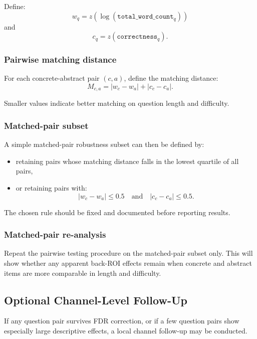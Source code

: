 Define:
\begin{equation}
w_q = z\!\left(\log(\texttt{total\_word\_count}_q)\right)
\end{equation}
and
\begin{equation}
c_q = z(\texttt{correctness}_q).
\end{equation}

\subsubsection{Pairwise matching distance}
For each concrete-abstract pair \((c,a)\), define the matching distance:
\begin{equation}
M_{c,a}
=
|w_c - w_a| + |c_c - c_a|.
\end{equation}

Smaller values indicate better matching on question length and difficulty.

\subsubsection{Matched-pair subset}
A simple matched-pair robustness subset can then be defined by:
\begin{itemize}
    \item retaining pairs whose matching distance falls in the lowest quartile of all pairs,
    \item or retaining pairs with:
    \begin{equation}
    |w_c - w_a| \leq 0.5
    \quad \text{and} \quad
    |c_c - c_a| \leq 0.5.
    \end{equation}
\end{itemize}

The chosen rule should be fixed and documented before reporting results.

\subsubsection{Matched-pair re-analysis}
Repeat the pairwise testing procedure on the matched-pair subset only.
This will show whether any apparent back-ROI effects remain when concrete and abstract items are
more comparable in length and difficulty.

\subsection{Optional Channel-Level Follow-Up}
If any question pair survives FDR correction, or if a few question pairs show especially large
descriptive effects, a local channel follow-up may be conducted.

